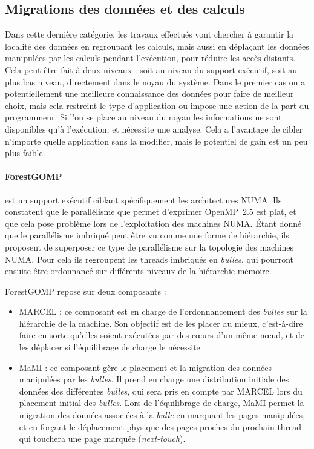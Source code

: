 \subsection{Migrations des données et des calculs}\label{sec:rw:numa:thread-data}

Dans cette dernière catégorie, les travaux effectués vont chercher à garantir la localité des données en regroupant les calculs, mais aussi en déplaçant les données manipulées par les calculs pendant l'exécution, pour réduire les accès distants.
Cela peut être fait à deux niveaux : soit au niveau du support exécutif, soit au plus bas niveau, directement dans le noyau du système.
Dans le premier cas on a potentiellement une meilleure connaissance des données pour faire de meilleur choix, mais cela restreint le type d'application ou impose une action de la part du programmeur.
Si l'on se place au niveau du noyau les informations ne sont disponibles qu'à l'exécution, et nécessite une analyse. Cela a l'avantage de cibler n'importe quelle application sans la modifier, mais le potentiel de gain est un peu plus faible.

\paragraph{ForestGOMP~\cite{Broquedis2010a}} est un support exécutif ciblant spécifiquement les architectures NUMA.
Ils constatent que le parallélisme que permet d'exprimer OpenMP~2.5 est plat, et que cela pose problème lors de l'exploitation des machines NUMA.
Étant donné que le parallélisme imbriqué peut être vu comme une forme de hiérarchie, ils proposent de superposer ce type de parallélisme sur la topologie des machines NUMA.
Pour cela ils regroupent les threads imbriqués en \emph{bulles}, qui pourront ensuite être ordonnancé sur différents niveaux de la hiérarchie mémoire.


ForestGOMP repose sur deux composants :
\begin{itemize}
  \item MARCEL : ce composant est en charge de l'ordonnancement des \emph{bulles} sur la hiérarchie de la machine. Son objectif est de les placer au mieux, c'est-à-dire faire en sorte qu'elles soient exécutées par des cœurs d'un même nœud, et de les déplacer si l'équilibrage de charge le nécessite.
  \item MaMI : ce composant gère le placement et la migration des données manipulées par les \emph{bulles}.
Il prend en charge une distribution initiale des données des différentes \emph{bulles}, qui sera pris en compte par MARCEL lors du placement initial des \emph{bulles}.
Lors de l'équilibrage de charge, MaMI permet la migration des données associées à la \emph{bulle} en marquant les pages manipulées, et en forçant le déplacement physique des pages proches du prochain thread qui touchera une page marquée (\emph{next-touch}).
\end{itemize}

